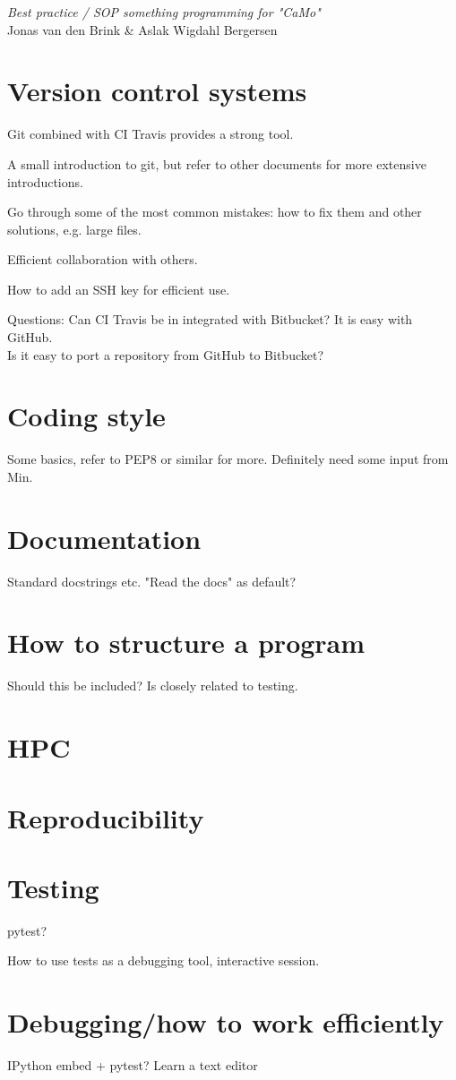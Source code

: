 \documentclass[11pt, a4paper, twoside]{report}
\begin{document}
\begingroup  
  \begin{center}
  \LARGE \textit{Best practice / SOP something programming for "CaMo"}\\[1.5em]
  \large Jonas van den Brink \& Aslak Wigdahl Bergersen \\
  \end{center}
\endgroup

\section*{Version control systems}
Git combined with CI Travis provides a strong tool.

A small introduction to git, but refer to other documents for more extensive introductions.

Go through some of the most common mistakes: how to fix them and other solutions, e.g. large files.

Efficient collaboration with others.

How to add an SSH key for efficient use.

Questions:
Can CI Travis be in integrated with Bitbucket? It is easy with GitHub.\\
Is it easy to port a repository from GitHub to Bitbucket?


\section*{Coding style}
Some basics, refer to PEP8 or similar for more. Definitely need some input from Min.


\section*{Documentation}
Standard docstrings etc.
"Read the docs" as default?


\section*{How to structure a program}
Should this be included? Is closely related to testing.


\section*{HPC}


\section*{Reproducibility}


\section*{Testing}
pytest?

How to use tests as a debugging tool, interactive session.


\section*{Debugging/how to work efficiently}
IPython embed + pytest?
Learn a text editor
\end{document}
